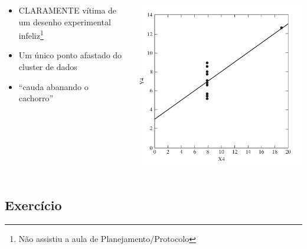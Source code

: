 \documentclass{beamer}
\begin{document}
\begin{frame}
  \begin{columns}
    \begin{column}{.5\textwidth}
      \begin{itemize}
        \tiny
      \item<2> CLARAMENTE vítima de um desenho experimental infeliz\footnote{Não assistiu a aula de Planejamento/Protocolo}
      \item<3,4> Um único ponto afastado do cluster de dados
      \item<4> ``cauda abanando o cachorro''
      \end{itemize}
    \end{column}
    \begin{column}{.5\textwidth}
      \begin{center}
        \includegraphics[width=\textwidth]{EDA/eda-dispersao4}
      \end{center}
    \end{column}
  \end{columns}
\end{frame}

\subsection{Exercício}
\end{document}
